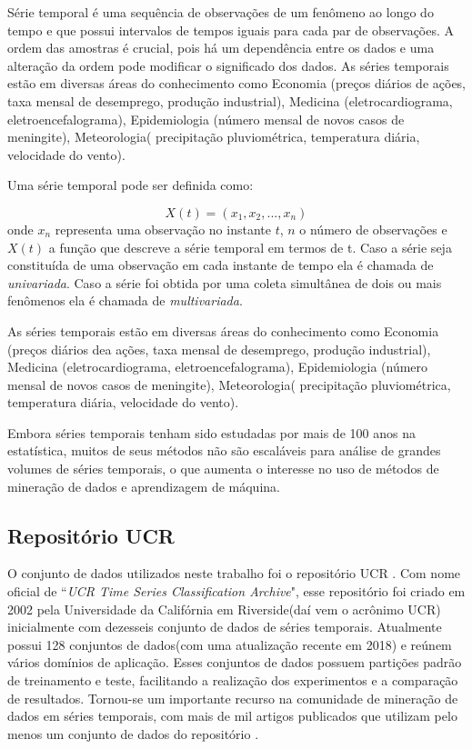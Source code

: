 Série temporal é uma sequência de observações de um fenômeno ao longo do tempo e que possui intervalos de tempos iguais para cada par de observações.  A ordem das amostras é crucial, pois há um dependência entre os dados e uma alteração da ordem pode modificar o significado dos dados. As séries temporais estão em diversas áreas do conhecimento como Economia (preços diários de ações, taxa mensal de desemprego, produção industrial), Medicina (eletrocardiograma, eletroencefalograma), Epidemiologia (número mensal de novos casos de meningite), Meteorologia( precipitação pluviométrica, temperatura diária, velocidade do vento).  

Uma série temporal pode ser definida como:

\begin{equation} \label{eq_TS}
X(t) = (x_1,x_2,...,x_n)
\end{equation}
onde $x_n$ representa uma observação no instante $t$, $n$ o número de observações e $X(t)$ a função que descreve a série temporal em termos de t. Caso a série seja constituída de uma observação em cada instante de tempo ela é chamada de \textit{univariada}. Caso a série foi obtida por uma coleta simultânea de dois ou mais fenômenos ela é chamada de \textit{multivariada}.

As séries temporais estão em diversas áreas do conhecimento como Economia (preços diários dea ações, taxa mensal de desemprego, produção industrial), Medicina (eletrocardiograma, eletroencefalograma), Epidemiologia (número mensal de novos casos de meningite), Meteorologia( precipitação pluviométrica, temperatura diária, velocidade do vento).

Embora séries temporais tenham sido estudadas por mais de 100 anos na estatística, muitos de seus métodos não são escaláveis para análise de grandes volumes de séries temporais, o que aumenta o interesse no uso de métodos de mineração de dados e aprendizagem de máquina. \cite{Maimon:2005:DMK:1088958}

\subsection{Repositório UCR}
O conjunto de dados utilizados neste trabalho foi o repositório UCR \cite{UCRArchive}. Com nome oficial de ``\textit{UCR Time Series Classification Archive}", esse repositório foi criado em 2002 pela Universidade da Califórnia em Riverside(daí vem o acrônimo UCR) inicialmente com dezesseis conjunto de dados de séries temporais. Atualmente possui 128 conjuntos de dados(com uma atualização recente em 2018) e reúnem vários domínios de aplicação. Esses conjuntos de dados possuem partições padrão de treinamento e teste, facilitando a realização dos experimentos e a comparação de resultados. Tornou-se um importante recurso na comunidade de mineração de dados em séries temporais, com mais de mil artigos publicados que utilizam pelo menos um conjunto de dados do repositório \cite{Dau2018TheUT}.


